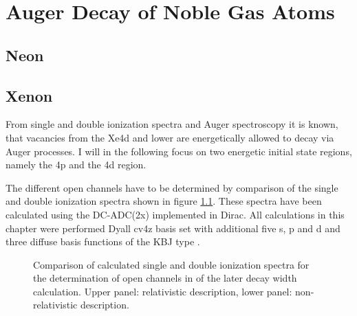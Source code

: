 \chapter{Auger Decay of Noble Gas Atoms}
\section{Neon}


\section{Xenon}
From single and double ionization spectra and Auger spectroscopy
it is known, that vacancies from the Xe4d and lower are energetically allowed to
decay via Auger processes. \cite{Siegbahn69}
I will in the following focus on two energetic initial state regions, namely
the 4p and the 4d region.

The different open channels have to be determined by comparison of the single
and double ionization spectra shown in figure \ref{figure:Xe_sdip}.
These spectra have been calculated using the
DC-ADC(2x) implemented in Dirac\cite{Pernpointner04_1,Pernpointner10_1,DIRAC13}.
All calculations in this chapter were performed 
Dyall cv4z basis set\cite{dyall5p06} with additional five s, p and d
and three diffuse basis functions                       
of the \ac{KBJ} type \cite{Kaufmann89}.

\begin{figure}[h]
  \centering
  
  
  \caption{Comparison of calculated single and double ionization spectra
           for the determination of open channels in of the later decay
           width calculation. Upper panel: relativistic description, lower
           panel: non-relativistic description.
           }
  \label{figure:Xe_sdip}
\end{figure}
\afterpage{\clearpage}



